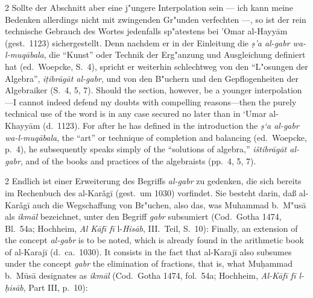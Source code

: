 \documentclass[10pt,a4paper]{article}
\renewcommand{\switchcolumn}{\syncronize\nointerlineskip\columnbreak}
\newcommand{\san}{\d{s}}
\newcommand{\s}[1]{\d{#1}}
\newcommand{\enquote}[1]{``#1''}
\begin{document}
\begin{paracol}{2}
Sollte der Abschnitt aber eine j"ungere Interpolation sein --- ich kann meine Bedenken allerdings nicht mit zwingenden Gr"unden verfechten ---, so ist der rein technische Gebrauch des Wortes jedenfalls sp"atestens bei 'Omar al-Hayy\=am (gest.\ 1123) sichergestellt. Denn nachdem er in der Einleitung die \textit{\san'a al-gabr wa-l-muq\=abala}, die \enquote{Kunst} oder Technik der Erg"anzung und Ausgleichung definiert hat (ed.\ Woepcke, S.\ 4), spricht er weiterhin schlechtweg von den \enquote{L"osungen der Algebra}, \textit{i\s{t}ibr\=ag\=at al-gabr}, und von den B"uchern und den Gepflogenheiten der Algebraiker (S.\ 4, 5, 7).
\switchcolumn
Should the section, however, be a younger interpolation---I cannot indeed defend my doubts with compelling reasons---then the purely technical use of the word is in any case secured no later than in `Umar al-Khayy\=am (d.\ 1123). For after he has defined in the introduction the \textit{\san`a al-gabr wa-l-muq\=abala}, the ``art'' or technique of completion and balancing (ed.\ Woepcke, p.\ 4), he subsequently speaks simply of the ``solutions of algebra,'' \textit{i\v{s}tibr\=ag\=at al-gabr}, and of the books and practices of the algebraists (pp.\ 4, 5, 7).
\end{paracol}

\begin{paracol}{2}
Endlich ist einer Erweiterung des Begriffs \textit{al-gabr} zu gedenken, die sich bereits im Rechenbuch des al-Kar\v{a}g\=i{} (gest.\ um 1030) vorfindet. Sie besteht darin, da\ss{} al-Kar\v{a}g\=i{} auch die Wegschaffung von Br"uchen, also das, was Muhammad b.\ M"us\=a als \textit{ikm\=al} bezeichnet, unter den Begriff \textit{gabr} subsumiert (Cod.\ Gotha 1474, Bl.\ 54a; Hochheim, \textit{Al K\=af\=i f\=i} l-\textit{His\=ab}, III.\ Teil, S.\ 10):
\switchcolumn
Finally, an extension of the concept \textit{al-gabr} is to be noted, which is already found in the arithmetic book of al-Karaj\={i} (d.\ ca.\ 1030). It consists in the fact that al-Karaj\={i} also subsumes under the concept \textit{gabr} the elimination of fractions, that is, what Mu\d{h}ammad b.\ M\=us\=a designates as \textit{ikm\=al} (Cod.\ Gotha 1474, fol.\ 54a; Hochheim, \textit{Al-K\=af\={i} f\={i} l-\d{h}is\=ab}, Part III, p.\ 10):
\end{paracol}
\end{document}
